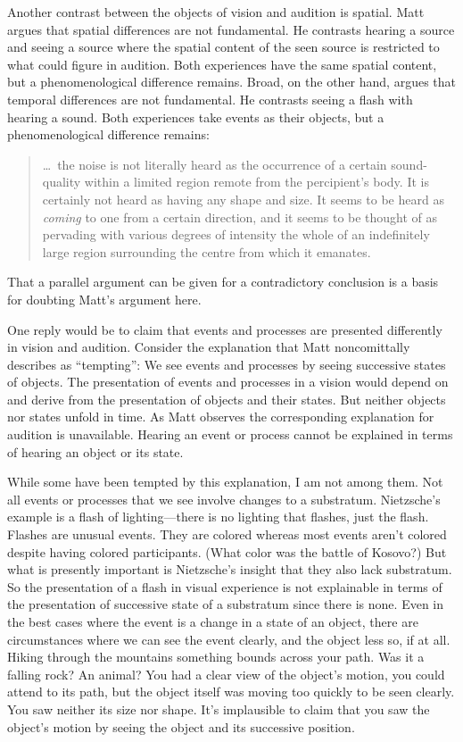 \documentclass[12pt]{article}
\begin{document}
Another contrast between the objects of vision and audition is spatial. Matt argues that spatial differences are not fundamental. He contrasts hearing a source and seeing a source where the spatial content of the seen source is restricted to what could figure in audition. Both experiences have the same spatial content, but a phenomenological difference remains. Broad, on the other hand, argues that temporal differences are not fundamental. He contrasts seeing a flash with hearing a sound. Both experiences take events as their objects, but a phenomenological difference remains:
\begin{quote}
	\ldots\ the noise is not literally heard as the occurrence of a certain sound-quality within a limited region remote from the percipient's body. It is certainly not heard as having any shape and size. It seems to be heard as \emph{coming} to one from a certain direction, and it seems to be thought of as pervading with various degrees of intensity the whole of an indefinitely large region surrounding the centre from which it emanates. \citep[32]{Broad:1965dq}
\end{quote}
That a parallel argument can be given for a contradictory conclusion is a basis for doubting Matt's argument here.

One reply would be to claim that events and processes are presented differently in vision and audition. Consider the explanation that Matt noncomittally describes as ``tempting'': We see events and processes by seeing successive states of objects. The presentation of events and processes in a vision would depend on and derive from the presentation of objects and their states. But neither objects nor states unfold in time. As Matt observes the corresponding explanation for audition is unavailable. Hearing an event or process cannot be explained in terms of hearing an object or its state. 

While some have been tempted by this explanation, I am not among them. Not all events or processes that we see involve changes to a substratum. Nietzsche's \citeyearpar[]{Nietzsche1887On-the-Genealog} example is a flash of lighting---there is no lighting that flashes, just the flash. Flashes are unusual events. They are colored whereas most events aren't colored despite having colored participants. (What color was the battle of Kosovo?) But what is presently important is Nietzsche's insight that they also lack substratum. So the presentation of a flash in visual experience is not explainable in terms of the presentation of successive state of a substratum since there is none. Even in the best cases where the event is a change in a state of an object, there are circumstances where we can see the event clearly, and the object less so, if at all. Hiking through the mountains something bounds across your path. Was it a falling rock? An animal? You had a clear view of the object's motion, you could attend to its path, but the object itself was moving too quickly to be seen clearly. You saw neither its size nor shape. It's implausible to claim that you saw the object's motion by seeing the object and its successive position.
\end{document}
